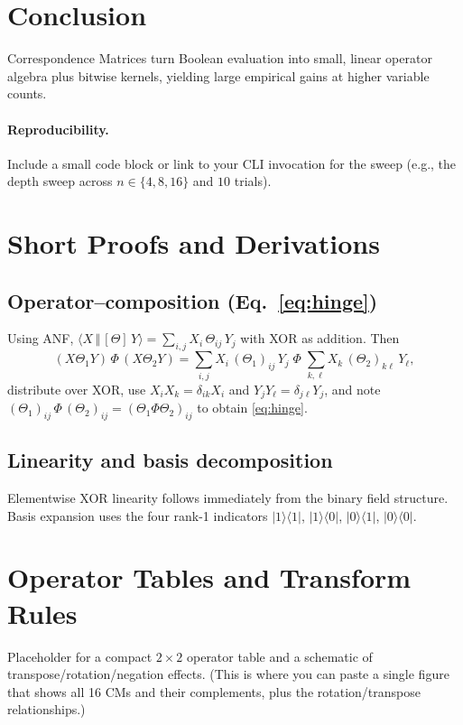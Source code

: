 \documentclass[11pt]{article}
\newcommand{\brrket}[2]{\langle #1 \,\Vert\, #2\rangle}  %
\newcommand{\CM}[1]{[{#1}]}
\begin{document}
\section{Conclusion}
Correspondence Matrices turn Boolean evaluation into small, linear operator algebra plus bitwise kernels, yielding large empirical gains at higher variable counts.

\paragraph{Reproducibility.}
Include a small code block or link to your CLI invocation for the sweep (e.g., the depth sweep across $n\in\{4,8,16\}$ and $10$ trials).

\appendix

\section{Short Proofs and Derivations}
\label{app:proofs}
\subsection{Operator--composition (Eq.~\ref{eq:hinge})}
\label{app:hinge-proof}
Using ANF, $\brrket{X}{\CM{\Theta}\,Y}=\sum_{i,j} X_i\,\Theta_{ij}\,Y_j$ with XOR as addition.
Then
\[
(X\Theta_1 Y)\,\Phi\,(X\Theta_2 Y)
=\sum_{i,j} X_i\,(\Theta_1)_{ij}\,Y_j \;\Phi\; \sum_{k,\ell} X_k\,(\Theta_2)_{k\ell}\,Y_\ell,
\]
distribute over XOR, use $X_iX_k=\delta_{ik}X_i$ and $Y_jY_\ell=\delta_{j\ell}Y_j$, and note $(\Theta_1)_{ij}\,\Phi\,(\Theta_2)_{ij}=(\Theta_1\Phi\Theta_2)_{ij}$ to obtain \eqref{eq:hinge}.

\subsection{Linearity and basis decomposition}
Elementwise XOR linearity follows immediately from the binary field structure.
Basis expansion uses the four rank-1 indicators $|1\rangle\!\langle 1|$, $|1\rangle\!\langle 0|$, $|0\rangle\!\langle 1|$, $|0\rangle\!\langle 0|$.

\section{Operator Tables and Transform Rules}
\label{app:tables}
\noindent Placeholder for a compact $2\times2$ operator table and a schematic of transpose/rotation/negation effects. (This is where you can paste a single figure that shows all 16 CMs and their complements, plus the rotation/transpose relationships.)
\end{document}
